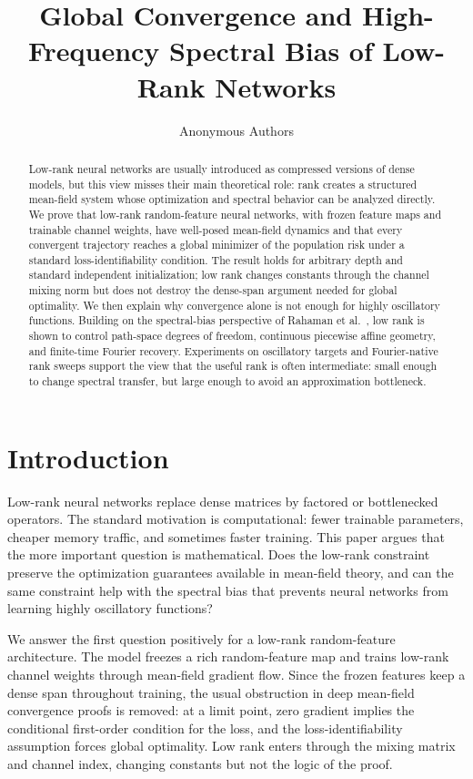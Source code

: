 \documentclass{article}
\title{Global Convergence and High-Frequency Spectral Bias of Low-Rank Networks}
\author{Anonymous Authors}
\begin{document}
\maketitle

\begin{abstract}
Low-rank neural networks are usually introduced as compressed versions of dense models, but this view misses their main theoretical role: rank creates a structured mean-field system whose optimization and spectral behavior can be analyzed directly. We prove that low-rank random-feature neural networks, with frozen feature maps and trainable channel weights, have well-posed mean-field dynamics and that every convergent trajectory reaches a global minimizer of the population risk under a standard loss-identifiability condition. The result holds for arbitrary depth and standard independent initialization; low rank changes constants through the channel mixing norm but does not destroy the dense-span argument needed for global optimality. We then explain why convergence alone is not enough for highly oscillatory functions. Building on the spectral-bias perspective of Rahaman et al.~\cite{rahaman2019}, low rank is shown to control path-space degrees of freedom, continuous piecewise affine geometry, and finite-time Fourier recovery. Experiments on oscillatory targets and Fourier-native rank sweeps support the view that the useful rank is often intermediate: small enough to change spectral transfer, but large enough to avoid an approximation bottleneck.
\end{abstract}

\section{Introduction}
\label{sec:introduction}

Low-rank neural networks replace dense matrices by factored or bottlenecked operators. The standard motivation is computational: fewer trainable parameters, cheaper memory traffic, and sometimes faster training. This paper argues that the more important question is mathematical. Does the low-rank constraint preserve the optimization guarantees available in mean-field theory, and can the same constraint help with the spectral bias that prevents neural networks from learning highly oscillatory functions?

We answer the first question positively for a low-rank random-feature architecture. The model freezes a rich random-feature map and trains low-rank channel weights through mean-field gradient flow. Since the frozen features keep a dense span throughout training, the usual obstruction in deep mean-field convergence proofs is removed: at a limit point, zero gradient implies the conditional first-order condition for the loss, and the loss-identifiability assumption forces global optimality. Low rank enters through the mixing matrix and channel index, changing constants but not the logic of the proof.
\end{document}
